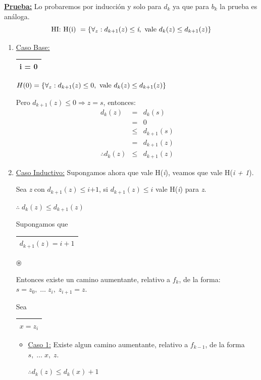 \documentclass[12pt,a4paper]{report}
\begin{document}
  		\textbf{\underline{Prueba:}} Lo probaremos por inducción y solo para $d_{k}$ ya que para $b_{k}$ la prueba es análoga.
  			\[ \textup{HI: H(i) } = \lbrace\forall_{z}: d_{k + 1}(z) \leq \textit{i}, \textup{ vale } d_{k}(z) \leq d_{k + 1}(z)\rbrace \]

  			\begin{enumerate}
  				\item \underline{Caso Base:} \begin{tabular}{|c|} \hline i = 0 \\\hline \end{tabular} \qquad $H(0) = \lbrace\forall_{z}: d_{k + 1}(z) \leq 0, \textup{ vale } d_{k}(z) \leq d_{k + 1}(z)  \rbrace$
  					\par Pero $d_{k + 1}(z) \leq 0 \Rightarrow z = \textit{s}$, entonces:
  					\begin{eqnarray}
  						\nonumber d_{k}(z) &=& d_{k}(s) \\
  						\nonumber &=& 0 \\
  						\nonumber &\leq & d_{k + 1}(s) \\
  						\nonumber &=& d_{k + 1}(z) \\
  						\nonumber \therefore d_{k}(z) & \leq & d_{k + 1}(z)
  					\end{eqnarray}
  				\item \underline{Caso Inductivo:} Supongamos ahora que vale H(\textit{i}), veamos que vale H(\textit{i + 1}).
  					\par Sea \textit{z} con $d_{k + 1}(z) \leq \textit{i+1}$, si $d_{k + 1}(z) \leq \textit{i}$ vale H(\textit{i}) para \textit{z}.
  					\par \begin{center} $\therefore \; d_{k}(z) \leq d_{k + 1}(z) $ \end{center}
  					\par Supongamos que \begin{tabular}{|c|} \hline $d_{k + 1}(z) = i + 1$ \\\hline \end{tabular} $\circledast$
  					\par Entonces existe un camino aumentante, relativo a $f_{k}$, de la forma: $s = z_{0},  \; \dotsc \; z_{i}, \; z_{i + 1} = z$.
  					\par Sea \begin{tabular}{|c|} \hline $x = z_{i}$ \\ \hline \end{tabular}

  					\begin{itemize}
  						\item \underline{Caso 1:} Existe algun camino aumentante, relativo a $f_{k - 1}$, de la forma $s, \; \dotsc \; x, \; z$.
  							\begin{center}
  								$\therefore d_{k}(z) \leq d_{k}(x) + 1$
  							\end{center}


\end{itemize}
\end{enumerate}
\end{document}

